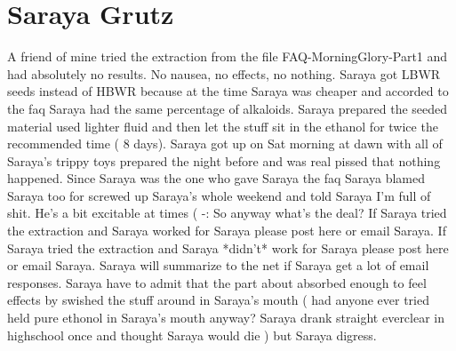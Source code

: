 \documentclass[12pt]{book}
\begin{document}
\chapter{Saraya Grutz}

A friend of mine tried the extraction from the file FAQ-MorningGlory-Part1 and had absolutely no results. No nausea, no effects, no nothing. Saraya got LBWR seeds instead of HBWR because at the time Saraya was cheaper and accorded to the faq Saraya had the same percentage of alkaloids. Saraya prepared the seeded material used lighter fluid and then let the stuff sit in the ethanol for twice the recommended time ( 8 days). Saraya got up on Sat morning at dawn with all of Saraya's trippy toys prepared the night before and was real pissed that nothing happened. Since Saraya was the one who gave Saraya the faq Saraya blamed Saraya too for screwed up Saraya's whole weekend and told Saraya I'm full of shit. He's a bit excitable at times ( -: So anyway what's the deal? If Saraya tried the extraction and Saraya worked for Saraya please post here or email Saraya. If Saraya tried the extraction and Saraya *didn't* work for Saraya please post here or email Saraya. Saraya will summarize to the net if Saraya get a lot of email responses. Saraya have to admit that the part about absorbed enough to feel effects by swished the stuff around in Saraya's mouth ( had anyone ever tried held pure ethonol in Saraya's mouth anyway? Saraya drank straight everclear in highschool once and thought Saraya would die ) but Saraya digress.
\end{document}
